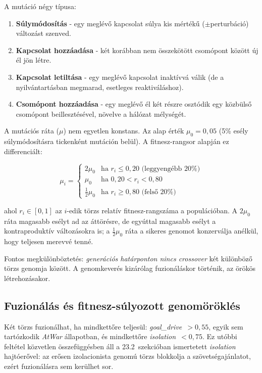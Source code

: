 A mutáció négy típusa:
\begin{enumerate}
  \item \textbf{Súlymódosítás} - egy meglévő kapcsolat súlya kis mértékű
    ($\pm$perturbáció) változást szenved.
  \item \textbf{Kapcsolat hozzáadása} - két korábban nem összekötött csomópont
    között új él jön létre.
  \item \textbf{Kapcsolat letiltása} - egy meglévő kapcsolat inaktívvá válik
    (de a nyilvántartásban megmarad, esetleges reaktiváláshoz).
  \item \textbf{Csomópont hozzáadása} - egy meglévő él két részre osztódik
    egy közbülső csomópont beillesztésével, növelve a hálózat mélységét.
\end{enumerate}

A mutációs ráta ($\mu$) nem egyetlen konstans. Az alap érték $\mu_0 = 0{,}05$
(5\% esély súlymódosításra tickenként mutáción belül). A fitnesz-rangsor alapján
ez differenciált:

\begin{equation}
\mu_i =
\begin{cases}
2\mu_0 & \text{ha } r_i \leq 0{,}20 \text{ (leggyengébb 20\%)} \\
\mu_0  & \text{ha } 0{,}20 < r_i < 0{,}80 \\
\tfrac{1}{2}\mu_0 & \text{ha } r_i \geq 0{,}80 \text{ (felső 20\%)}
\end{cases}
\end{equation}

ahol $r_i \in [0,1]$ az $i$-edik törzs relatív fitnesz-rangszáma a populációban.
A $2\mu_0$ ráta magasabb esélyt ad az áttörésre, de egyúttal magasabb esélyt
a kontraproduktív változásokra is; a $\tfrac{1}{2}\mu_0$ ráta a sikeres genomot
konzerválja anélkül, hogy teljesen merevvé tenné.

Fontos megkülönböztetés: \textit{generációs határponton nincs crossover}
két különböző törzs genomja között. A genomkeverés kizárólag fuzionáláskor
történik, az örökös létrehozásakor.

\subsection*{Fuzionálás és fitnesz-súlyozott genomöröklés}

Két törzs fuzionálhat, ha mindkettőre teljesül: \textit{goal\_drive}~$> 0{,}55$,
egyik sem tartózkodik \textit{AtWar} állapotban, és mindkettőre
\textit{isolation}~$< 0{,}75$.
Ez utóbbi feltétel közvetlen összefüggésben áll a 23.2~szekcióban ismertetett
\textit{isolation} hajtóerővel: az erősen izolacionista genomú törzs blokkolja
a szövetségajánlatot, ezért fuzionálásra sem kerülhet sor.

